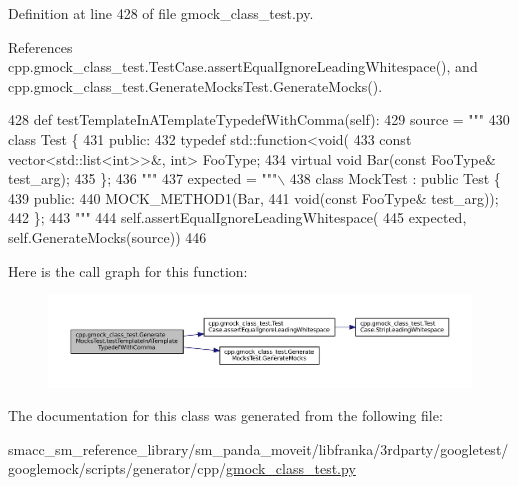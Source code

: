 Definition at line 428 of file gmock\+\_\+class\+\_\+test.\+py.



References cpp.\+gmock\+\_\+class\+\_\+test.\+Test\+Case.\+assert\+Equal\+Ignore\+Leading\+Whitespace(), and cpp.\+gmock\+\_\+class\+\_\+test.\+Generate\+Mocks\+Test.\+Generate\+Mocks().


\begin{DoxyCode}
428   \textcolor{keyword}{def }testTemplateInATemplateTypedefWithComma(self):
429     source = \textcolor{stringliteral}{"""}
430 \textcolor{stringliteral}{class Test \{}
431 \textcolor{stringliteral}{ public:}
432 \textcolor{stringliteral}{  typedef std::function<void(}
433 \textcolor{stringliteral}{      const vector<std::list<int>>&, int> FooType;}
434 \textcolor{stringliteral}{  virtual void Bar(const FooType& test\_arg);}
435 \textcolor{stringliteral}{\};}
436 \textcolor{stringliteral}{"""}
437     expected = \textcolor{stringliteral}{"""\(\backslash\)}
438 \textcolor{stringliteral}{class MockTest : public Test \{}
439 \textcolor{stringliteral}{public:}
440 \textcolor{stringliteral}{MOCK\_METHOD1(Bar,}
441 \textcolor{stringliteral}{void(const FooType& test\_arg));}
442 \textcolor{stringliteral}{\};}
443 \textcolor{stringliteral}{"""}
444     self.assertEqualIgnoreLeadingWhitespace(
445         expected, self.GenerateMocks(source))
446 
\end{DoxyCode}
Here is the call graph for this function\+:
\nopagebreak
\begin{figure}[H]
\begin{center}
\leavevmode
\includegraphics[width=350pt]{classcpp_1_1gmock__class__test_1_1GenerateMocksTest_a67d1336b8782257fcfcdbda8c8d4f794_cgraph}
\end{center}
\end{figure}


The documentation for this class was generated from the following file\+:\begin{DoxyCompactItemize}
\item 
smacc\+\_\+sm\+\_\+reference\+\_\+library/sm\+\_\+panda\+\_\+moveit/libfranka/3rdparty/googletest/googlemock/scripts/generator/cpp/\hyperlink{gmock__class__test_8py}{gmock\+\_\+class\+\_\+test.\+py}\end{DoxyCompactItemize}
